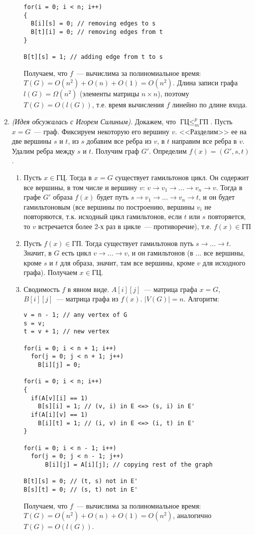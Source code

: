 \documentclass[a4paper]{article}
\def\GC{{\mbox{ГЦ}}}
\def\GP{{\mbox{ГП}}}
\begin{document}
\begin{enumerate}
\begin{enumerate}
\begin{lstlisting}
for(i = 0; i < n; i++)
{
  B[i][s] = 0; // removing edges to s
  B[t][i] = 0; // removing edges from t
}

B[t][s] = 1; // adding edge from t to s
\end{lstlisting}
Получаем, что $f$~--- вычислима за полиномиальное время: $T(G)=O(n^2)+O(n)+O(1)=O(n^2)$. Длина записи графа $l(G)=\Omega(n^2)$ (элементы матрицы $n\times n$), поэтому $T(G)=O(l(G))$, т.е. время вычисления $f$ линейно по длине входа.
\end{enumerate}
\item {\em (Идея обсужалась с Игорем Силиным)}. Докажем, что $\GC\leqslant_m^p\GP$. Пусть $x=G$~--- граф. Фиксируем некоторую его вершину $v$. <<Разделим>> ее на две вершины $s$ и $t$, из $s$ добавим все ребра из $v$, в $t$ направим все ребра в $v$. Удалим ребра между $s$ и $t$. Получим граф $G'$. Определим $f(x)=(G',s,t)$.\begin{enumerate}
\item Пусть $x\in\GC$. Тогда в $x=G$ существует гамильтонов цикл. Он содержит все вершины, в том числе и вершину $v$: $v\to v_1\to...\to v_n\to v$. Тогда в графе $G'$ образа $f(x)$ будет путь $s\to v_1\to...\to v_n\to t$, и он будет гамильтоновым (все вершины по построению, вершины $v_i$ не повторяются, т.к. исходный цикл гамильтонов, если $t$ или $s$ повторяется, то $v$ встречается более 2-х раз в цикле~--- противоречие), т.е. $f(x)\in\GP$
\item Пусть $f(x)\in\GP$. Тогда существует гамильтонов путь $s\to...\to t$. Значит, в $G$ есть цикл $v\to...\to v$, и он гамильтонов (в $...$ все вершины, кроме $s$ и $t$ для образа, значит, там все вершины, кроме $v$ для исходного графа). Получаем $x\in\GC$.
\item Сводимость $f$ в явном виде. $A[i][j]$~--- матрица графа $x=G$, $B[i][j]$~--- матрица графа из $f(x)$. $|V(G)|=n$. Алгоритм:
\begin{lstlisting}
v = n - 1; // any vertex of G
s = v;
t = v + 1; // new vertex

for(i = 0; i < n + 1; i++)
  for(j = 0; j < n + 1; j++)
    B[i][j] = 0;

for(i = 0; i < n; i++)
{
  if(A[v][i] == 1)
    B[s][i] = 1; // (v, i) in E <=> (s, i) in E'
  if(A[i][v] == 1)
    B[i][t] = 1; // (i, v) in E <=> (i, t) in E'
}

for(i = 0; i < n - 1; i++)
  for(j = 0; j < n - 1; j++)
      B[i][j] = A[i][j]; // copying rest of the graph

B[t][s] = 0; // (t, s) not in E'
B[s][t] = 0; // (s, t) not in E'
\end{lstlisting}
Получаем, что $f$~--- вычислима за полиномиальное время: $T(G)=O(n^2)+O(n)+O(1)=O(n^2)$, аналогично $T(G)=O(l(G))$.
\end{enumerate}
\end{enumerate}
\end{document}
